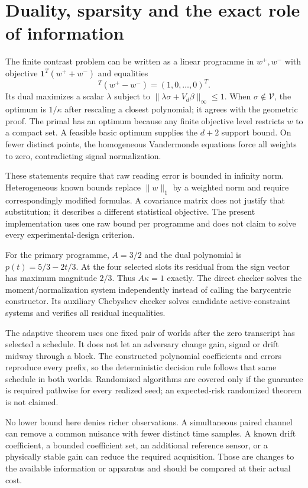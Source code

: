 \documentclass[11pt,letterpaper]{article}
\newcommand{\calV}{\mathcal V}\newcommand{\calP}{\mathcal P}
\newcommand{\norm}[1]{\lVert#1\rVert}
\theoremstyle{definition}\newtheorem{definition}[theorem]{Definition}
\theoremstyle{remark}\newtheorem{remark}[theorem]{Remark}
\begin{document}
\appendix
\section{Duality, sparsity and the exact role of information}
\label{app:duality}
The finite contrast problem can be written as a linear programme in $w^+,w^-$ with objective $\mathbf1^T(w^++w^-)$ and equalities
\begin{equation}
 [\sigma\ \ V_d]^T(w^+-w^-)=(1,0,\ldots,0)^T.
\end{equation}
Its dual maximizes a scalar $\lambda$ subject to $\norm{\lambda\sigma+V_d\beta}_\infty\le1$. When $\sigma\notin\calV$, the optimum is $1/\kappa$ after rescaling a closest polynomial; it agrees with the geometric proof. The primal has an optimum because any finite objective level restricts $w$ to a compact set. A feasible basic optimum supplies the $d+2$ support bound. On fewer distinct points, the homogeneous Vandermonde equations force all weights to zero, contradicting signal normalization.

These statements require that raw reading error is bounded in infinity norm. Heterogeneous known bounds replace $\norm w_1$ by a weighted norm and require correspondingly modified formulas. A covariance matrix does not justify that substitution; it describes a different statistical objective. The present implementation uses one raw bound per programme and does not claim to solve every experimental-design criterion.

For the primary programme, $A=3/2$ and the dual polynomial is $p(t)=5/3-2t/3$. At the four selected slots its residual from the sign vector has maximum magnitude $2/3$. Thus $A\kappa=1$ exactly. The direct checker solves the moment/normalization system independently instead of calling the barycentric constructor. Its auxiliary Chebyshev checker solves candidate active-constraint systems and verifies all residual inequalities.

The adaptive theorem uses one fixed pair of worlds after the zero transcript has selected a schedule. It does not let an adversary change gain, signal or drift midway through a block. The constructed polynomial coefficients and errors reproduce every prefix, so the deterministic decision rule follows that same schedule in both worlds. Randomized algorithms are covered only if the guarantee is required pathwise for every realized seed; an expected-risk randomized theorem is not claimed.

No lower bound here denies richer observations. A simultaneous paired channel can remove a common nuisance with fewer distinct time samples. A known drift coefficient, a bounded coefficient set, an additional reference sensor, or a physically stable gain can reduce the required acquisition. Those are changes to the available information or apparatus and should be compared at their actual cost.
\end{document}
